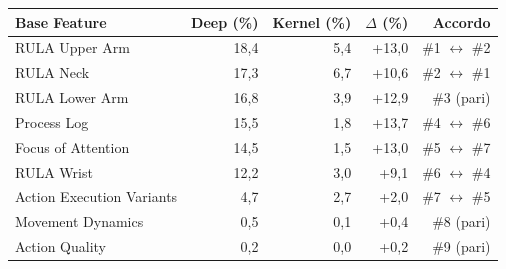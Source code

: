 \begin{tabular*}{\linewidth}{@{}l@{\extracolsep{\fill}}rrrr@{}}
\toprule
\textbf{Base Feature} & \textbf{Deep (\%)} & \textbf{Kernel (\%)} & \textbf{$\Delta$ (\%)} & \textbf{Accordo} \\
\midrule
RULA Upper Arm & 18{,}4 & 5{,}4 & +13{,}0 & \#1 $\leftrightarrow$ \#2 \\
RULA Neck & 17{,}3 & 6{,}7 & +10{,}6 & \#2 $\leftrightarrow$ \#1 \\
RULA Lower Arm & 16{,}8 & 3{,}9 & +12{,}9 & \#3 (pari) \\
Process Log & 15{,}5 & 1{,}8 & +13{,}7 & \#4 $\leftrightarrow$ \#6 \\
Focus of Attention & 14{,}5 & 1{,}5 & +13{,}0 & \#5 $\leftrightarrow$ \#7 \\
RULA Wrist & 12{,}2 & 3{,}0 & +9{,}1 & \#6 $\leftrightarrow$ \#4 \\
Action Execution Variants & 4{,}7 & 2{,}7 & +2{,}0 & \#7 $\leftrightarrow$ \#5 \\
Movement Dynamics & 0{,}5 & 0{,}1 & +0{,}4 & \#8 (pari) \\
Action Quality & 0{,}2 & 0{,}0 & +0{,}2 & \#9 (pari) \\
\bottomrule
\end{tabular*}
